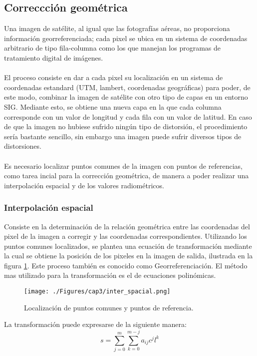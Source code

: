 \subsection{Correccci\'on geom\'etrica}\label{sec:corrGeometrica}
Una imagen de sat\'elite, al igual que las fotograf\'ias a\'ereas, no proporciona informaci\'on georreferenciada; cada pixel se ubica en un sistema de coordenadas arbitrario de tipo fila-columna como los que manejan los programas de tratamiento digital de im\'agenes.\\~\\
El proceso consiste en dar a cada pixel su localizaci\'on en un sistema de coordenadas estandard (UTM, lambert, coordenadas geogr\'aficas) para poder, de este modo, combinar la imagen de sat\'elite con otro tipo de capas en un entorno SIG. Mediante esto, se obtiene una nueva capa en la que cada columna corresponde con un valor de longitud y cada fila con un valor de latitud. En caso de que la imagen no hubiese sufrido ningún tipo de distorsi\'on, el procedimiento ser\'ia bastante sencillo, sin embargo una imagen puede sufrir diversos tipos de distorsiones.\\~\\
Es necesario localizar puntos comunes de la imagen con puntos de referencias, como tarea incial para la correcci\'on geom\'etrica, de manera a poder realizar una interpolaci\'on espacial y de los valores radiom\'etricos\cite{deniseCultivos}.

\subsubsection{Interpolaci\'on espacial}
Consiste en la determinaci\'on de la relaci\'on geom\'etrica entre las coordenadas del pixel de la imagen a corregir y las coordenadas correspondientes. Utilizando los puntos comunes localizados, se plantea una ecuaci\'on de transformaci\'on mediante la cual se obtiene la posici\'on de los pixeles en la imagen de salida, ilustrada en la figura \ref{fig:intEspacial}. Este proceso tambi\'en es conocido como Georreferenciaci\'on. El m\'etodo mas utilizado para la transformaci\'on es el de ecuaciones polin\'omicas. 
    \begin{figure}[H]
    	\centering
    	\texttt{[image: ./Figures/cap3/inter\_spacial.png]}
    	\caption{Localizaci\'on de puntos comunes y puntos de referencia.}
    	\label{fig:intEspacial}
    \end{figure}
 
 La transformaci\'on puede expresarse de la siguiente manera:
	\begin{equation}
	s = \sum_{j=0}^{m} \sum_{k=0}^{m-j} a_{ij}c^{j}l^{k}
	\end{equation} 

